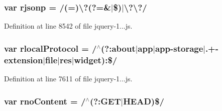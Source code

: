 \subsubsection[{rjsonp}]{\setlength{\rightskip}{0pt plus 5cm}var rjsonp = /(=)\textbackslash{}?(?=\&$\vert$\$)$\vert$\textbackslash{}?\textbackslash{}?/}\label{obj_2_release_2_package_2_package_tmp_2_scripts_2jquery-1_810_82_8js_a8b62e46075611fd1fc0bbb78b14d113a}


Definition at line 8542 of file jquery-\/1...\+js.

\hypertarget{obj_2_release_2_package_2_package_tmp_2_scripts_2jquery-1_810_82_8js_af4dd13c90298bbf53ce08ec707dc9e2a}{}
\subsubsection[{rlocal\+Protocol}]{\setlength{\rightskip}{0pt plus 5cm}var rlocal\+Protocol = /$^\wedge$(?\+:about$\vert$app$\vert$app-\/storage$\vert$.+-\/extension$\vert$file$\vert$res$\vert$widget)\+:\$/}\label{obj_2_release_2_package_2_package_tmp_2_scripts_2jquery-1_810_82_8js_af4dd13c90298bbf53ce08ec707dc9e2a}


Definition at line 7611 of file jquery-\/1...\+js.

\hypertarget{obj_2_release_2_package_2_package_tmp_2_scripts_2jquery-1_810_82_8js_a537d744d72e31ec312aa3f16ef576d3f}{}
\subsubsection[{rno\+Content}]{\setlength{\rightskip}{0pt plus 5cm}var rno\+Content = /$^\wedge$(?\+:G\+E\+T$\vert$H\+E\+A\+D)\$/}\label{obj_2_release_2_package_2_package_tmp_2_scripts_2jquery-1_810_82_8js_a537d744d72e31ec312aa3f16ef576d3f}



